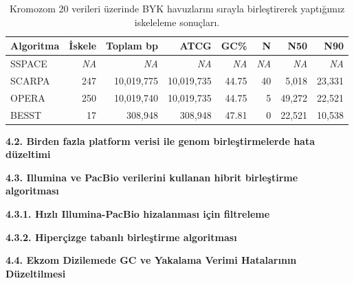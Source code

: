 \documentclass[11pt]{article}
\begin{document}
\begin{table}[htb]
\caption{Kromozom 20 verileri üzerinde BYK havuzlarını sırayla birleştirerek yaptığımız iskeleleme sonuçları.}
\label{tab:chr20h}
\begin{center}
\begin{tabular}{|l|r|r|r|r|r|r|r|}
\hline 
{\bf Algoritma } & {\bf İskele} & {\bf Toplam bp} & {\bf ATCG} & {\bf GC\%} & {\bf N} & {\bf N50} & {\bf N90} \\
\hline
SSPACE &  \textit{NA}  &  \textit{NA}     &     \textit{NA}  &   \textit{NA}   &  \textit{NA}    &  \textit{NA}    &  \textit{NA}   \\
SCARPA &   247	& 10,019,775 &	10,019,735	& 44.75	& 40	& 5,018 &	23,331\\
OPERA  &  250	& 10,019,740	& 10,019,735	& 44.75	& 5	& 49,272	& 22,521 \\
BESST  &  17    & 308,948 & 308,948  & 47.81 & 0  & 22,521 & 10,538 \\ \hline
\end{tabular}
\end{center}
\end{table}


{\bf \large 4.2. Birden fazla platform verisi ile genom birleştirmelerde hata düzeltimi}




{\bf \large 4.3. Illumina ve PacBio verilerini kullanan hibrit birleştirme algoritması}

{\bf 4.3.1. Hızlı Illumina-PacBio hizalanması için filtreleme}



{\bf 4.3.2. Hiperçizge tabanlı birleştirme algoritması}




\clearpage

\noindent
{\bf \large 4.4. Ekzom Dizilemede GC ve Yakalama Verimi Hatalarının Düzeltilmesi}
\end{document}
